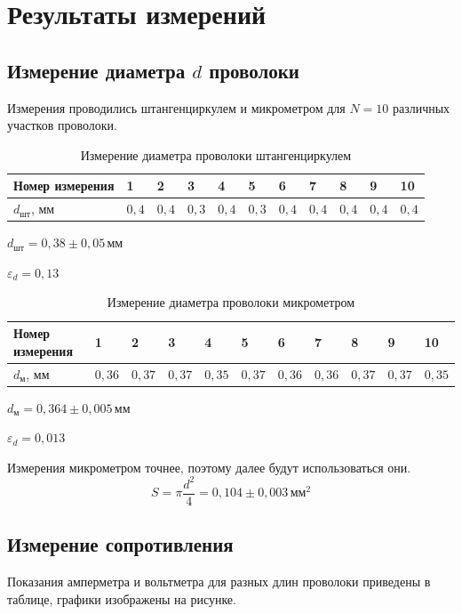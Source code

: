 \section{Результаты измерений}
\subsection{Измерение диаметра $d$ проволоки}
Измерения проводились штангенциркулем и микрометром для $N=10$ различных
участков проволоки.

\begin{table}[h!]
    \caption{Измерение диаметра проволоки штангенциркулем}
    \begin{tabular}{|l|l|l|l|l|l|l|l|l|l|l|}
    \hline
    Номер измерения             & 1       & 2       & 3       & 4       & 5       & 6       & 7       & 8       & 9       & 10      \\ \hline
    $d_{\text{шт}}$, мм         & $0{,}4$ & $0{,}4$ & $0{,}3$ & $0{,}4$ & $0{,}3$ & $0{,}4$ & $0{,}4$ & $0{,}4$ & $0{,}4$ & $0{,}4$ \\ \hline
    \end{tabular}
\end{table}
$d_{\text{шт}}=0{,}38\pm0{,}05\,\text{мм}$

$\varepsilon_d = 0{,}13$

\begin{table}[h!]
    \caption{Измерение диаметра проволоки микрометром}
    \begin{tabular}{|l|l|l|l|l|l|l|l|l|l|l|}
    \hline
    Номер измерения             & 1       & 2       & 3       & 4       & 5       & 6       & 7       & 8       & 9       & 10      \\ \hline
    $d_{\text{м}}$, мм          & $0{,}36$ & $0{,}37$ & $0{,}37$ & $0{,}35$ & $0{,}37$ & $0{,}36$ & $0{,}36$ & $0{,}37$ & $0{,}37$ & $0{,}35$ \\ \hline
    \end{tabular}
\end{table}
$d_{\text{м}}=0{,}364\pm0{,}005\,\text{мм}$

$\varepsilon_d = 0{,}013$

Измерения микрометром точнее, поэтому далее будут использоваться они.
\[S=\pi\frac{d^2}{4}=0{,}104\pm 0{,}003\,\text{мм}^2\]

\subsection{Измерение сопротивления}
Показания амперметра и вольтметра для разных длин проволоки приведены в таблице, графики изображены на рисунке.


